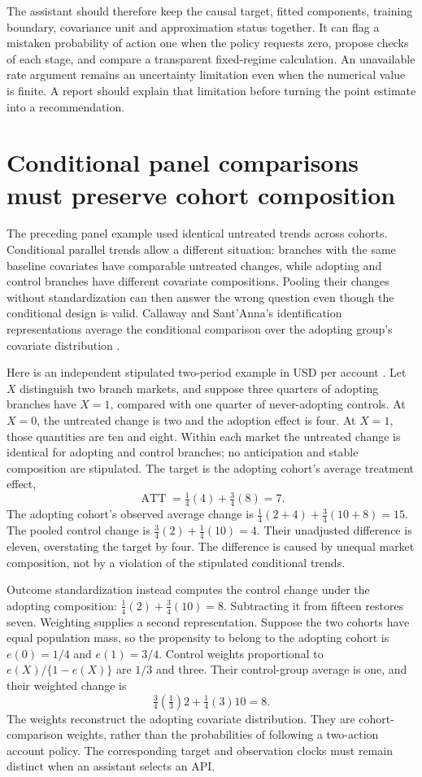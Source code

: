 The assistant should therefore keep the causal target, fitted components,
training boundary, covariance unit and approximation status together. It can
flag a mistaken probability of action one when the policy requests zero,
propose checks of each stage, and compare a transparent fixed-regime
calculation. An unavailable rate argument remains an uncertainty limitation
even when the numerical value is finite. A report should explain that
limitation before turning the point estimate into a recommendation.

\section{Conditional panel comparisons must preserve cohort composition}
\label{exec14:l5-composition}

The preceding panel example used identical untreated trends across cohorts.
Conditional parallel trends allow a different situation: branches with the
same baseline covariates have comparable untreated changes, while adopting
and control branches have different covariate compositions. Pooling their
changes without standardization can then answer the wrong question even
though the conditional design is valid. Callaway and Sant'Anna's
identification representations average the conditional comparison over the
adopting group's covariate distribution \cite{callaway2021}.

Here is an independent stipulated two-period example in USD per account
\cite{exec14_workflow_remainder}. Let $X$ distinguish two branch markets,
and suppose three quarters of adopting branches have $X=1$, compared with
one quarter of never-adopting controls. At $X=0$, the untreated change is two
and the adoption effect is four. At $X=1$, those quantities are ten and
eight. Within each market the untreated change is identical for adopting
and control branches; no anticipation and stable composition are stipulated.
The target is the adopting cohort's average treatment effect,
\[
 \operatorname{ATT}=\tfrac14(4)+\tfrac34(8)=7.
\]
The adopting cohort's observed average change is
$\tfrac14(2+4)+\tfrac34(10+8)=15$. The pooled control change is
$\tfrac34(2)+\tfrac14(10)=4$. Their unadjusted difference is eleven,
overstating the target by four. The difference is caused by unequal market
composition, not by a violation of the stipulated conditional trends.

Outcome standardization instead computes the control change under the
adopting composition: $\tfrac14(2)+\tfrac34(10)=8$. Subtracting it from
fifteen restores seven. Weighting supplies a second representation. Suppose
the two cohorts have equal population mass, so the propensity to belong to
the adopting cohort is $e(0)=1/4$ and $e(1)=3/4$. Control weights proportional
to $e(X)/\{1-e(X)\}$ are $1/3$ and three. Their control-group average is
one, and their weighted change is
\[
 \tfrac34\left(\tfrac13\right)2
 +\tfrac14(3)10=8.
\]
The weights reconstruct the adopting covariate distribution. They are
cohort-comparison weights, rather than the probabilities of following a
two-action account policy. The corresponding target and observation clocks
must remain distinct when an assistant selects an API.

